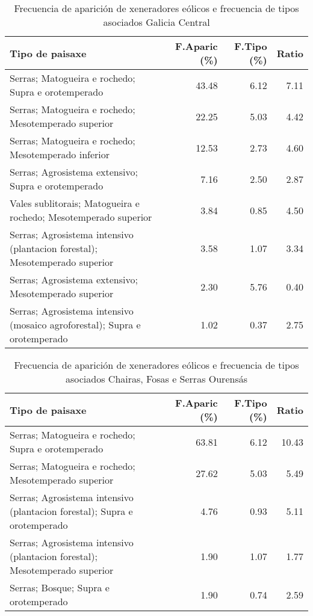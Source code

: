 \begin{table}[p]
\centering
\caption{Frecuencia de aparición de xeneradores eólicos e frecuencia de tipos asociados Galicia Central} 
\label{veolico7}
\begin{tabular}{lrrr}
  \hline
Tipo de paisaxe & F.Aparic (\%) & F.Tipo (\%) & Ratio \\ 
  \hline
Serras; Matogueira e rochedo; Supra e orotemperado & 43.48 & 6.12 & 7.11 \\ 
  Serras; Matogueira e rochedo; Mesotemperado superior & 22.25 & 5.03 & 4.42 \\ 
  Serras; Matogueira e rochedo; Mesotemperado inferior & 12.53 & 2.73 & 4.60 \\ 
  Serras; Agrosistema extensivo; Supra e orotemperado & 7.16 & 2.50 & 2.87 \\ 
  Vales sublitorais; Matogueira e rochedo; Mesotemperado superior & 3.84 & 0.85 & 4.50 \\ 
  Serras; Agrosistema intensivo (plantacion forestal); Mesotemperado superior & 3.58 & 1.07 & 3.34 \\ 
  Serras; Agrosistema extensivo; Mesotemperado superior & 2.30 & 5.76 & 0.40 \\ 
  Serras; Agrosistema intensivo (mosaico agroforestal); Supra e orotemperado & 1.02 & 0.37 & 2.75 \\ 
   \hline
\end{tabular}
\end{table}
\begin{table}[p]
\centering
\caption{Frecuencia de aparición de xeneradores eólicos e frecuencia de tipos asociados Chairas, Fosas e Serras Ourensás} 
\label{veolico8}
\begin{tabular}{lrrr}
  \hline
Tipo de paisaxe & F.Aparic (\%) & F.Tipo (\%) & Ratio \\ 
  \hline
Serras; Matogueira e rochedo; Supra e orotemperado & 63.81 & 6.12 & 10.43 \\ 
  Serras; Matogueira e rochedo; Mesotemperado superior & 27.62 & 5.03 & 5.49 \\ 
  Serras; Agrosistema intensivo (plantacion forestal); Supra e orotemperado & 4.76 & 0.93 & 5.11 \\ 
  Serras; Agrosistema intensivo (plantacion forestal); Mesotemperado superior & 1.90 & 1.07 & 1.77 \\ 
  Serras; Bosque; Supra e orotemperado & 1.90 & 0.74 & 2.59 \\ 
   \hline
\end{tabular}
\end{table}
